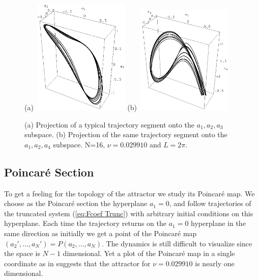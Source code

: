 \documentclass[pre,preprint,groupedaddress,showpacs,showkeys]{revtex4}
\begin{document}
%
 \begin{figure}[t!]
    (a)~\includegraphics[width=1.8in]{figs/pl1.eps}%
    \hspace{0.2cm}%
    (b)~\includegraphics[width=1.8in]{figs/pl2.eps}
    \caption{(a) Projection of a typical trajectory segment onto the {$a_1,a_2,a_3$} subspace.
             (b) Projection of the same trajectory segment onto the {$a_1,a_2,a_4$} subspace. N=16,
                                         $\nu=0.029910$ and $L=2\pi$.
            }
    \label{f:trajectories}
 \end{figure}

\subsection{Poincar\'e Section}
\label{sec:poincare}

 To get a feeling for the topology of the attractor we study its Poincar\'e map.
 We choose as the Poincar\'e section the hyperplane $a_1=0$, and follow trajectories
 of the truncated system (\ref{eq:Fcoef Trunc})
 with arbitrary initial conditions on this hyperplane. Each time the trajectory returns
 on the $a_1=0$ hyperplane in the same direction as initially we get a point of the Poincar\'e
 map $(a_2',\ldots,a_N')=P(a_2,\dots,a_N)$. The dynamics is still difficult to
 visualize since the space is $N-1$ dimensional. Yet a plot of the Poincar\'e
 map in a single coordinate as in  suggests that the attractor for $\nu=0.029910$
 is nearly one dimensional.
\end{document}
